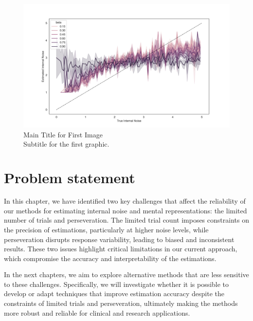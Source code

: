 \begin{figure}[H]
    \centering
    \includegraphics[width=15cm]{MainLayout/Images/chapter5/overestimation_noise.jpg}
    \caption{Main Title for First Image \\ \small Subtitle for the first graphic.}
    \label{fig:overestimation_noise}
\end{figure}


\section {Problem statement} 
In this chapter, we have identified two key challenges that affect the reliability of our methods for estimating internal noise and mental representations: the limited number of trials and perseveration. The limited trial count imposes constraints on the precision of estimations, particularly at higher noise levels, while perseveration disrupts response variability, leading to biased and inconsistent results. These two issues highlight critical limitations in our current approach, which compromise the accuracy and interpretability of the estimations.

In the next chapters, we aim to explore alternative methods that are less sensitive to these challenges. Specifically, we will investigate whether it is possible to develop or adapt techniques that improve estimation accuracy despite the constraints of limited trials and perseveration, ultimately making the methods more robust and reliable for clinical and research applications.

